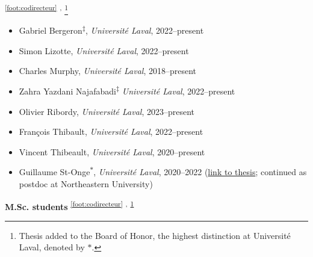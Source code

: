 \documentclass[11pt]{article}
\begin{document}
\textsuperscript{\ref{foot:codirecteur}}%
\textsuperscript{,}%
\footnote{\label{foot:tableau}Thesis added to the Board of Honor, the highest distinction at Université Laval, denoted by $\ast$.}
%
\begin{itemize}
  \item Gabriel Bergeron\textsuperscript{$\ddagger$}, \textit{Universit\'e Laval}, 2022--present
  \item Simon Lizotte, \textit{Universit\'e Laval}, 2022--present
  \item Charles Murphy, \textit{Universit\'e Laval}, 2018--present%
  \item Zahra Yazdani Najafabadi\textsuperscript{$\ddagger$} \textit{Université Laval}, 2022--present
  \item Olivier Ribordy, \textit{Universit\'e Laval}, 2023--present
  \item Fran\c{c}ois Thibault, \textit{Universit\'e Laval}, 2022--present
  \item Vincent Thibeault, \textit{Université Laval}, 2020--present
  \item Guillaume St-Onge\textsuperscript{$\ast$}, \textit{Université Laval}, 2020--2022 {\small(\href{http://antoineallard.github.io/files/theses/StOnge.2022.PhD.pdf}{link to thesis}; continued as postdoc at Northeastern University)}
\end{itemize}
%
%
%
\pagebreak
\textbf{M.Sc. students}%
%
\textsuperscript{\ref{foot:codirecteur}}%
\textsuperscript{,}%
\textsuperscript{\ref{foot:tableau}}%
%
\end{document}
